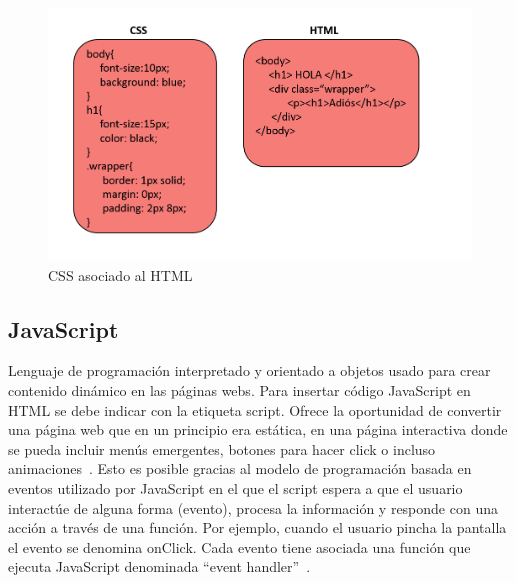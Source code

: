 \documentclass[a4paper, 12pt]{book}
\begin{document}
\begin{figure}[h]
        \centering
        \includegraphics[scale=0.4]{img/cssyhtml.PNG}
        \caption{CSS asociado al HTML}
        \label{figura:css}
\end{figure}

\subsection{JavaScript}
Lenguaje de programación interpretado y orientado a objetos usado para crear contenido dinámico en las páginas webs. Para insertar código JavaScript en HTML se debe indicar con la etiqueta script. Ofrece la oportunidad de convertir una página web que en un principio era estática, en una página interactiva donde se pueda incluir menús emergentes, botones para hacer click o incluso animaciones~\cite{mdn1}. Esto es posible gracias al modelo de programación basada en eventos utilizado por JavaScript en el que el script espera a que el usuario interactúe de alguna forma (evento), procesa la información y responde con una acción a través de una función. Por ejemplo, cuando el usuario pincha la pantalla el evento se denomina onClick. Cada evento tiene asociada una función que ejecuta JavaScript denominada ``event handler''~\cite{perez2019introduccion}.
\end{document}
